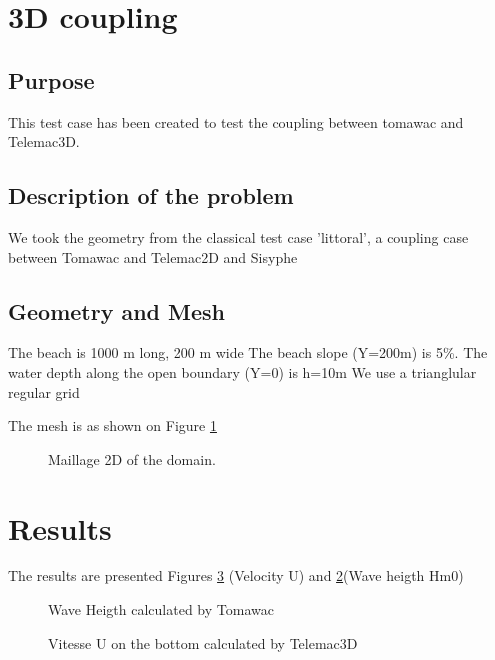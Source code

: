 \section{3D coupling}
%
%
\subsection{Purpose}
%
This test case has been created to test the coupling between tomawac and Telemac3D.

%
\subsection{Description of the problem}
We took the geometry from the classical test case 'littoral', a coupling case between Tomawac and Telemac2D and Sisyphe
\subsection{Geometry and Mesh}
%
The beach is 1000 m long, 200 m wide
 The beach slope (Y=200m) is 5\%.
 The water depth along the open boundary (Y=0) is h=10m
We use a trianglular regular grid 

The mesh is as shown on Figure \ref{3Dcouplingmesh}
\begin{figure} [!h]
\centering
{}
 \caption{Maillage 2D of the domain.}
\label{3Dcouplingmesh}
\end{figure}

\section{Results}
The results are presented Figures \ref{figres3Dcoupl2} (Velocity U) and \ref{figres3Dcoupl}(Wave heigth Hm0)

\begin{figure} [!h]
\centering
{}
 \caption{Wave Heigth calculated by Tomawac}
\label{figres3Dcoupl}
\end{figure}

\begin{figure} [!h]
\centering
{}
 \caption{Vitesse U on the bottom calculated by Telemac3D}
\label{figres3Dcoupl2}
\end{figure}

